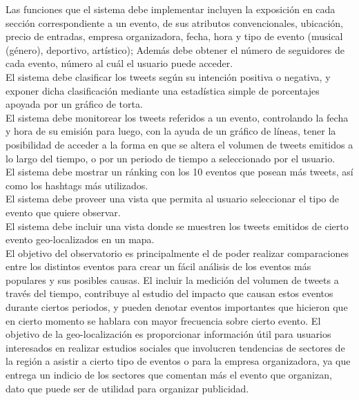\documentclass{memoria}
\begin{document}
Las funciones que el sistema debe implementar incluyen la exposición en cada sección correspondiente a un evento, de sus atributos convencionales, ubicación, precio de entradas, empresa organizadora, fecha, hora y tipo de evento (musical (género), deportivo, artístico); Además debe obtener el número de seguidores de cada evento, número al cuál el usuario puede acceder.\\
El sistema debe clasificar los tweets según su intención positiva o negativa, y exponer dicha clasificación mediante una estadística simple de porcentajes apoyada por un gráfico de torta.\\
El sistema debe monitorear los tweets referidos a un evento, controlando la fecha y hora de su emisión para luego, con la ayuda de un gráfico de líneas, tener la posibilidad de acceder a la forma en que se altera el volumen de tweets emitidos a lo largo del tiempo, o por un periodo de tiempo a seleccionado por el usuario.\\
El sistema debe mostrar un ránking con los 10 eventos que posean más tweets, así como los hashtags más utilizados.\\
El sistema debe proveer una vista que permita al usuario seleccionar el tipo de evento que quiere observar.\\
El sistema debe incluir una vista donde se muestren los tweets emitidos de cierto evento geo-localizados en un mapa.\\
El objetivo del observatorio es principalmente el de poder realizar comparaciones entre los distintos eventos para crear un fácil análisis de los eventos más populares y sus posibles causas. El incluir la medición del volumen de tweets a través del tiempo, contribuye al estudio del impacto que causan estos eventos durante ciertos periodos, y pueden denotar eventos importantes que hicieron que en cierto momento se hablara con mayor frecuencia sobre cierto evento. El objetivo de la geo-localización es proporcionar información útil para usuarios interesados en realizar estudios sociales que involucren tendencias de sectores de la región a asistir a cierto tipo de eventos o para la empresa organizadora, ya que entrega un indicio de los sectores que comentan más el evento que organizan, dato que puede ser de utilidad para organizar publicidad.
\end{document}
